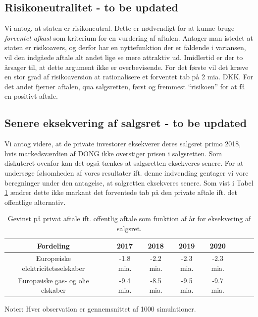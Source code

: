 \documentclass{article}
\begin{document}

\subsection{Risikoneutralitet - to be updated}

Vi antog, at staten er risikoneutral. Dette er nødvendigt for at kunne bruge \emph{forventet afkast} som kriterium for en vurdering af aftalen. Antager man istedet at staten er risikoavers, og derfor har en nyttefunktion der er faldende i variansen, vil den indgåede aftale alt andet lige se mere attraktiv ud. Imidlertid er der to årsager til, at dette argument ikke er overbevisende. For det første vil det kræve en stor grad af risikoaversion at rationalisere et forventet tab på 2 mia. DKK. For det andet fjerner aftalen, qua salgsretten, først og fremmest \enquote{risikoen} for at få en positivt aftale. 

\subsection{Senere eksekvering af salgsret - to be updated}

Vi antog videre, at de private investorer eksekverer deres salgsret primo 2018, hvis markedsværdien af DONG ikke overstiger prisen i salgsretten. Som diskuteret ovenfor kan det også tænkes at salgsretten eksekveres senere. For at undersøge følsomheden af vores resultater ift. denne indvending gentager vi vore beregninger under den antagelse, at salgretten eksekveres senere. Som vist i Tabel \ref{tab:robust_aar} ændrer dette ikke markant det forventede tab på den private aftale ift. det offentlige alternativ.

\begin{table}[h]
	\caption{Gevinst på privat aftale ift. offentlig aftale som funktion af \aa{}r for eksekvering af salgsret.}  
	\label{tab:robust_aar}
	\begin{tabularx}{\linewidth}{cXccccccr}
	\toprule[1pt]
	Fordeling && 2017 & 2018 & 2019 & 2020 \\
	\hline 
		Europ\ae{}iske elektricitetsselskaber && -1.8 mia. & -2.2 mia. & -2.3 mia. & -2.3 mia. \\
	Europ\ae{}iske gas- og olie elskaber && -9.4 mia. & -8.5 mia. & -9.5 mia.  &  -9.7 mia.  \\
		\bottomrule[1pt]
	\end{tabularx}
	\begin{minipage}{\linewidth}
		\footnotesize{Noter: Hver observation er gennemsnittet af 1000 simulationer.}
	\end{minipage}
\end{table}
\end{document}

